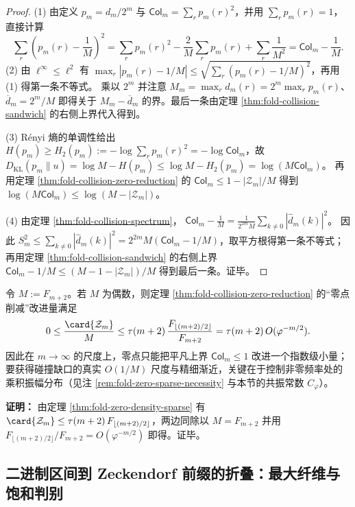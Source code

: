 \begin{proof}
(1) 由定义 \(p_m=d_m/2^m\) 与 \(\mathsf{Col}_m=\sum_r p_m(r)^2\)，并用 \(\sum_r p_m(r)=1\)，直接计算
\[
\sum_r\left(p_m(r)-\frac{1}{M}\right)^2
=\sum_r p_m(r)^2-\frac{2}{M}\sum_r p_m(r)+\sum_r\frac{1}{M^2}
=\mathsf{Col}_m-\frac{1}{M}.
\]
(2) 由 \(\ell^\infty\le \ell^2\) 有 \(\max_r|p_m(r)-1/M|\le \sqrt{\sum_r(p_m(r)-1/M)^2}\)，再用 (1) 得第一条不等式。
乘以 \(2^m\) 并注意 \(M_m=\max_r d_m(r)=2^m\max_r p_m(r)\)、\(\overline d_m=2^m/M\) 即得关于 \(M_m-\overline d_m\) 的界。最后一条由定理 \ref{thm:fold-collision-sandwich} 的右侧上界代入得到。
\par
(3) Rényi 熵的单调性给出 \(H(p_m)\ge H_2(p_m):=-\log\sum_r p_m(r)^2=-\log \mathsf{Col}_m\)，故
\(
D_{\mathrm{KL}}(p_m\|u)=\log M-H(p_m)\le \log M-H_2(p_m)=\log(M\mathsf{Col}_m)
\)。
再用定理 \ref{thm:fold-collision-zero-reduction} 的 \(\mathsf{Col}_m\le 1-|\mathcal{Z}_m|/M\) 得到 \(\log(M\mathsf{Col}_m)\le \log(M-|\mathcal{Z}_m|)\)。
\par
(4) 由定理 \ref{thm:fold-collision-spectrum}，
\(
\mathsf{Col}_m-\frac{1}{M}=\frac{1}{2^{2m}M}\sum_{k\ne 0}|\widehat d_m(k)|^2
\)。
因此 \(S_m^2\le \sum_{k\ne 0}|\widehat d_m(k)|^2=2^{2m}M(\mathsf{Col}_m-1/M)\)，取平方根得第一条不等式；
再用定理 \ref{thm:fold-collision-sandwich} 的右侧上界 \(\mathsf{Col}_m-1/M\le (M-1-|\mathcal{Z}_m|)/M\) 得到最后一条。证毕。
\end{proof}

\begin{corollary}[零点削减项的相对指数小量]
\label{cor:fold-collision-zero-sparsity-impact}
令 \(M:=F_{m+2}\)。若 \(M\) 为偶数，则定理 \ref{thm:fold-collision-zero-reduction} 的“零点削减”改进量满足
\[
0\le \frac{\card{\mathcal{Z}_m}}{M}
\le
\tau(m+2)\,\frac{F_{\lfloor (m+2)/2\rfloor}}{F_{m+2}}
=\tau(m+2)\,O(\varphi^{-m/2}).
\]
因此在 \(m\to\infty\) 的尺度上，零点只能把平凡上界 \(\mathsf{Col}_m\le 1\) 改进一个指数级小量；要获得碰撞缺口的真实 \(O(1/M)\) 尺度与精细渐近，关键在于控制非零频率处的乘积振幅分布（见注 \ref{rem:fold-zero-sparse-necessity} 与本节的共振常数 \(C_\varphi\)）。
\end{corollary}

\textbf{证明：}
由定理 \ref{thm:fold-zero-density-sparse} 有 \(\card{\mathcal{Z}_m}\le \tau(m+2)\,F_{\lfloor (m+2)/2\rfloor}\)，两边同除以 \(M=F_{m+2}\) 并用 \(F_{\lfloor (m+2)/2\rfloor}/F_{m+2}=O(\varphi^{-m/2})\) 即得。证毕。



\subsection{二进制区间到 Zeckendorf 前缀的折叠：最大纤维与饱和判别}\label{app:fold-binary-prefix}

